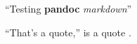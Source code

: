 ``Testing \textbf{pandoc} \emph{markdown}''

``That's a quote,'' is a quote \cite{de_solla_price_editorial_1978}.
